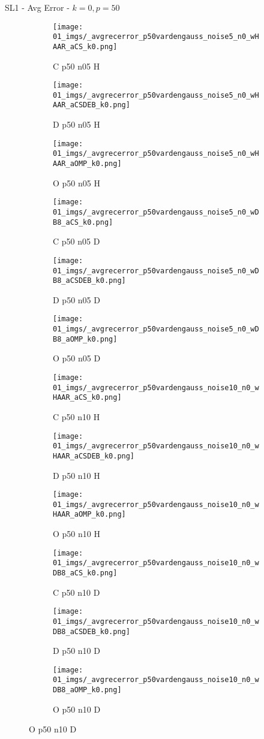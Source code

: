 \begin{frame}{SL1 - Avg Error - $k=0,p=50$}{}
\begin{figure}
\begin{subfigure}{0.13\textwidth}
\texttt{[image: 01\_imgs/\_avgrecerror\_p50vardengauss\_noise5\_n0\_wHAAR\_aCS\_k0.png]}
\caption*{\tiny C p50 n05 H}
\end{subfigure}
\begin{subfigure}{0.13\textwidth}
\texttt{[image: 01\_imgs/\_avgrecerror\_p50vardengauss\_noise5\_n0\_wHAAR\_aCSDEB\_k0.png]}
\caption*{\tiny D p50 n05 H}
\end{subfigure}
\begin{subfigure}{0.13\textwidth}
\texttt{[image: 01\_imgs/\_avgrecerror\_p50vardengauss\_noise5\_n0\_wHAAR\_aOMP\_k0.png]}
\caption*{\tiny O p50 n05 H}
\end{subfigure}
\begin{subfigure}{0.13\textwidth}
\texttt{[image: 01\_imgs/\_avgrecerror\_p50vardengauss\_noise5\_n0\_wDB8\_aCS\_k0.png]}
\caption*{\tiny C p50 n05 D}
\end{subfigure}
\begin{subfigure}{0.13\textwidth}
\texttt{[image: 01\_imgs/\_avgrecerror\_p50vardengauss\_noise5\_n0\_wDB8\_aCSDEB\_k0.png]}
\caption*{\tiny D p50 n05 D}
\end{subfigure}
\begin{subfigure}{0.13\textwidth}
\texttt{[image: 01\_imgs/\_avgrecerror\_p50vardengauss\_noise5\_n0\_wDB8\_aOMP\_k0.png]}
\caption*{\tiny O p50 n05 D}
\end{subfigure}

\vspace{5pt}

\begin{subfigure}{0.13\textwidth}
\texttt{[image: 01\_imgs/\_avgrecerror\_p50vardengauss\_noise10\_n0\_wHAAR\_aCS\_k0.png]}
\caption*{\tiny C p50 n10 H}
\end{subfigure}
\begin{subfigure}{0.13\textwidth}
\texttt{[image: 01\_imgs/\_avgrecerror\_p50vardengauss\_noise10\_n0\_wHAAR\_aCSDEB\_k0.png]}
\caption*{\tiny D p50 n10 H}
\end{subfigure}
\begin{subfigure}{0.13\textwidth}
\texttt{[image: 01\_imgs/\_avgrecerror\_p50vardengauss\_noise10\_n0\_wHAAR\_aOMP\_k0.png]}
\caption*{\tiny O p50 n10 H}
\end{subfigure}
\begin{subfigure}{0.13\textwidth}
\texttt{[image: 01\_imgs/\_avgrecerror\_p50vardengauss\_noise10\_n0\_wDB8\_aCS\_k0.png]}
\caption*{\tiny C p50 n10 D}
\end{subfigure}
\begin{subfigure}{0.13\textwidth}
\texttt{[image: 01\_imgs/\_avgrecerror\_p50vardengauss\_noise10\_n0\_wDB8\_aCSDEB\_k0.png]}
\caption*{\tiny D p50 n10 D}
\end{subfigure}
\begin{subfigure}{0.13\textwidth}
\texttt{[image: 01\_imgs/\_avgrecerror\_p50vardengauss\_noise10\_n0\_wDB8\_aOMP\_k0.png]}
\caption*{\tiny O p50 n10 D}
\end{subfigure}


\end{figure}
\end{frame}
